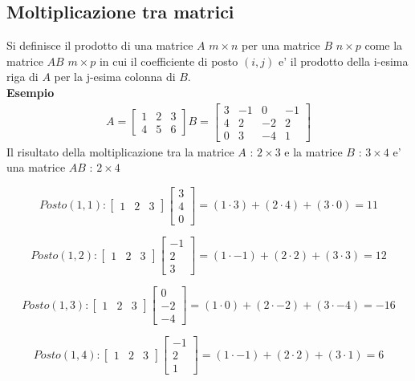 \documentclass[a4paper, 10pt]{article}
\begin{document}
	\subsection{Moltiplicazione tra matrici}
	Si definisce il prodotto di una matrice $A$  $m \times n$ per una matrice $B$ $n \times p$ come la matrice
	$AB$  $m \times p$ in cui il coefficiente di posto $(i,j)$ e' il prodotto della i-esima riga di $A$ per la 
	j-esima colonna di $B$. \\
	\textbf{Esempio}
	\begin{align*}
		A = 
		\begin{bmatrix}
			1 & 2 & 3 \\
			4 & 5 & 6 
		\end{bmatrix}
		B = 
		\begin{bmatrix}
			3 & -1 & 0 & -1 \\
			4 & 2 & -2 & 2 \\
			0 & 3 & -4 & 1
		\end{bmatrix}
	\end{align*}
	Il risultato della moltiplicazione tra la matrice $A$ : $2 \times 3$ e la matrice $B$ : $3 \times 4$ 
	e' una matrice $AB$ : $2 \times 4$
	
	\[ Posto (1,1): 	\begin{bmatrix}	1 & 2 & 3 \end{bmatrix} \begin{bmatrix} 3 \\ 4 \\ 0 \end{bmatrix} 
			= (1 \cdot 3) + (2 \cdot 4) + (3 \cdot 0) = 11 \]
	
	\[ Posto (1,2): 	\begin{bmatrix} 1 & 2 & 3 \end{bmatrix} \begin{bmatrix} -1 \\ 2 \\ 3 \end{bmatrix}
			= (1 \cdot -1) + (2 \cdot 2) + (3 \cdot 3) = 12  \]
			
	\[ Posto (1,3): \begin{bmatrix} 1 & 2 & 3 \end{bmatrix} \begin{bmatrix} 0 \\ -2 \\ -4 	\end{bmatrix}
			= (1 \cdot 0) + (2 \cdot -2) + (3 \cdot -4) = -16 \]
	
	\[ Posto (1,4): 	\begin{bmatrix} 	1 & 2 & 3 \end{bmatrix} \begin{bmatrix} -1 \\ 2 \\ 1 \end{bmatrix}
			= (1 \cdot -1) + (2 \cdot 2) + (3 \cdot 1) = 6 \]
	
\end{document}
